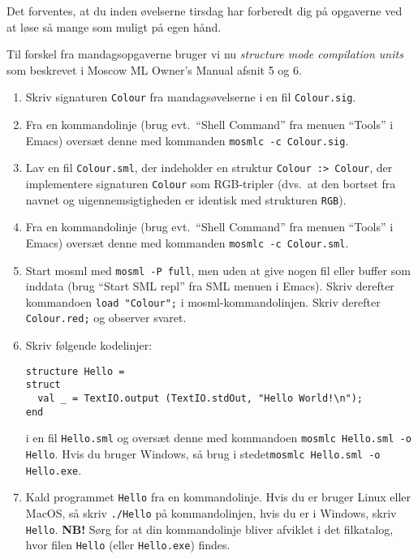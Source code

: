 \documentclass[a4paper,12pt]{article}
\begin{document}
Det forventes, at du inden øvelserne tirsdag har forberedt dig på
opgaverne ved at løse så mange som muligt på egen hånd.

\vspace{1ex}

Til forskel fra mandagsopgaverne bruger vi nu \emph{structure mode
  compilation units} som beskrevet i Moscow ML Owner's Manual afsnit 5
og 6.

\begin{enumerate}[{7}T1]
\item Skriv signaturen \lstinline{Colour} fra mandagsøvelserne i en
  fil \texttt{Colour.sig}.

\item Fra en kommandolinje (brug evt.\ ``Shell Command'' fra menuen
  ``Tools'' i Emacs) oversæt denne med kommanden \texttt{mosmlc -c
  Colour.sig}.

\item Lav en fil \texttt{Colour.sml}, der indeholder en struktur
  \lstinline{Colour :> Colour}, der implementere signaturen
  \lstinline{Colour} som RGB-tripler (dvs.\ at den bortset fra navnet
  og uigennemsigtigheden er identisk med strukturen \lstinline{RGB}).

\item Fra en kommandolinje (brug evt.\ ``Shell Command'' fra menuen
  ``Tools'' i Emacs) oversæt denne med kommanden \texttt{mosmlc -c
  Colour.sml}.

\item Start mosml med \texttt{mosml -P full}, men uden at give nogen
  fil eller buffer som inddata (brug ``Start SML repl'' fra SML menuen
  i Emacs).  Skriv derefter kommandoen \texttt{load "Colour";} i
  mosml-kommandolinjen.  Skriv derefter \texttt{Colour.red;} og
  observer svaret.

\item Skriv følgende kodelinjer:

\begin{Verbatim}
structure Hello =
struct
  val _ = TextIO.output (TextIO.stdOut, "Hello World!\n");
end
\end{Verbatim}

  i en fil \texttt{Hello.sml} og oversæt denne med kommandoen\newline
  \texttt{mosmlc Hello.sml -o Hello}.  Hvis du bruger Windows, så brug i
  stedet\newline \texttt{mosmlc Hello.sml -o Hello.exe}.

\item Kald programmet \texttt{Hello} fra en kommandolinje.  Hvis du er
  bruger Linux eller MacOS, så skriv \texttt{./Hello} på kommandolinjen,
  hvis du er i Windows, skriv \texttt{Hello}.  \textbf{NB!} Sørg for
  at din kommandolinje bliver afviklet i det filkatalog, hvor filen
  \texttt{Hello} (eller \texttt{Hello.exe}) findes.


\end{enumerate}
\end{document}
